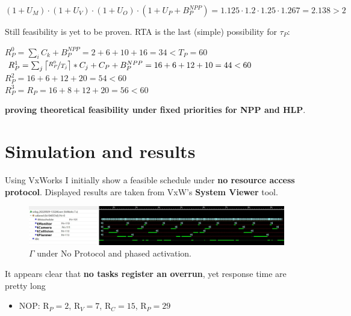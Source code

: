 \documentclass{article}
\begin{document}
\begin{center}                      \label{hb}
    $(1+U_{M})\cdot(1+ U_{V})\cdot(1+ U_{O})\cdot (1+ U_{P} + B_{P}^{NPP}) = 1.125\cdot1.2\cdot1.25 \cdot1.267 =2.138> 2$
\end{center}

Still feasibility is yet to be proven. RTA is the last (simple) possibility for $\tau_{P}$:

\begin{center}                      \label{rta}
    $R_{P}^{0}= \sum_{i}C_{k} + B_{P}^{NPP}=2+6+10+16=34<T_{P}=60$\\\medskip{}
    $R_{P}^{1}= \sum_{j}\left \lceil{\nicefrac{R_{P}^{0}}{T_{j} }}\right \rceil *C_{j} + C_{P} + B_{P}^{NPP}=16+6+12+10 =44<60$\\\medskip{}
    $R_{P}^{2}= 16+6+12+20=54<60$\\\medskip{}
    $R_{P}^{3}=R_{P}= 16+8+12+20=56<60$\\\medskip{}
\end{center}

\textbf{proving theoretical feasibility under fixed priorities for NPP and HLP}.




\section{Simulation and results}                   \label{simulation}

Using VxWorks I initially show a feasible schedule under \textbf{no resource access protocol}. Displayed results are taken from VxW's \textbf{System Viewer} tool.

\begin{figure}[H]                                   \label{fig_nop}
  \centering
  \includegraphics[width=13.9cm]{media/nop_phased.jpg}
  \caption{$\Gamma$ under No Protocol and phased activation.}
\end{figure}

It appears clear that \textbf{no tasks register an overrun}, yet response time are pretty long
\begin{itemize}
    \item \begin{center}
            NOP: R$_{P}=2$, R$_{V}=7$, R$_{C}=15$, R$_{P}=29$
        \end{center}
\end{itemize}
\end{document}
